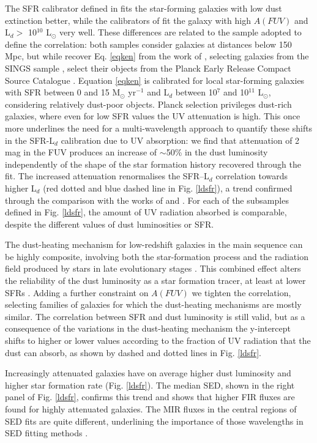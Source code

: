 \documentclass{aa}
\begin{document}
The SFR calibrator defined in \cite{ken1} fits the star-forming galaxies with low dust extinction  better, while the calibrators of \cite{cle} fit  the galaxy with high $A(FUV)$ and L$_d >$ 10$^{10}$ L$_\odot$ very well. These differences are related to the sample adopted to define the correlation: both samples consider galaxies at distances below 150 Mpc, but while \cite{ken1} recover Eq. \ref{eqken} from the work of \cite{hao}, selecting galaxies from the SINGS sample \citep{ken3}, \cite{cle} select their objects from the Planck Early Release Compact Source Catalogue \cite[ERCSC,][]{pla}. Equation \ref{eqken} is calibrated for local star-forming galaxies with SFR between 0 and 15 M$_\odot$ yr$^{-1}$ and L$_d$ between 10$^7$ and 10$^{11}$ L$_\odot$, considering relatively dust-poor objects. Planck selection privileges dust-rich galaxies, where even for low SFR values the UV attenuation is high. This once more  underlines the need for a multi-wavelength approach to quantify these shifts in the SFR-L$_d$ calibration due to UV absorption: we find that attenuation of 2 mag in the FUV produces an increase of $\sim$50\%  in the dust luminosity independently of the shape of the star formation history recovered through the fit. The increased attenuation renormalises the SFR--L$_d$ correlation towards higher L$_d$ (red dotted and blue dashed line in Fig. \ref{ldsfr}), a trend confirmed through the comparison with the works of \cite{ken2} and \cite{cle}. For each of the subsamples defined in Fig. \ref{ldsfr}, the amount of UV radiation absorbed is comparable, despite the different values of dust luminosities or SFR. 

The dust-heating mechanism for low-redshift galaxies in the main sequence can be highly composite, involving both the star-formation process and the radiation field produced by stars in late evolutionary stages \citep{lon,ben,ben2,ben3,via,via2,boq2,ner}. This combined effect alters the reliability of the dust luminosity as a star formation tracer, at least at lower SFRs \citep[see e.g.][]{ken2,pap2}. Adding a further constraint on $A(FUV)$ we tighten the correlation, selecting families of galaxies for which the dust-heating mechanisms are mostly similar. The correlation between SFR and dust luminosity is still valid, but as a consequence of the variations in the dust-heating mechanism the y-intercept shifts to higher or lower values according to the fraction of UV radiation that the dust can absorb, as shown by dashed and dotted lines in Fig. \ref{ldsfr}.

Increasingly attenuated galaxies  have on average higher dust luminosity and higher star formation rate (Fig. \ref{ldsfr}). The median SED, shown in the right panel of Fig. \ref{ldsfr}, confirms this trend and shows that higher FIR fluxes are found for highly attenuated galaxies. The MIR fluxes in the central regions of SED fits are quite different, underlining the importance of those wavelengths in SED fitting methods \citep{bua}. 
\end{document}
